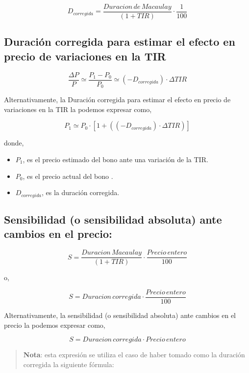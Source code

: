 \documentclass[
  letterpaper,
  DIV=11,
  numbers=noendperiod]{scrreprt}
\begin{document}
\begin{tcolorbox}
\[D_{corregida}=\frac{Duracion\,de\, Macaulay}{\left(1+TIR\right)}\cdot\frac{1}{100}\]

\subsection*{Duración corregida para estimar el efecto en precio de
variaciones en la
TIR}\label{duraciuxf3n-corregida-para-estimar-el-efecto-en-precio-de-variaciones-en-la-tir}

\[\frac{\Delta P}{P}\simeq  \frac{P_1-P_0}{P_0}\simeq \left(-D_{corregida}\right)\cdot\Delta TIR\]

Alternativamente, la Duración corregida para estimar el efecto en precio
de variaciones en la TIR la podemos expresar como,

\[P_1\simeq P_0\cdot\left[1+((-D_{corregida})\cdot\Delta TIR)\right]\]

donde,

\begin{itemize}
\item
  \(P_1\), es el precio estimado del bono ante una variación de la TIR.
\item
  \(P_0\), es el precio actual del bono .
\item
  \(D_{corregida}\), es la duración corregida.
\end{itemize}

\subsection*{Sensibilidad (o sensibilidad absoluta) ante cambios en el
precio:}\label{sensibilidad-o-sensibilidad-absoluta-ante-cambios-en-el-precio}

\[S=\frac{Duracion\,Macaulay}{\left(1+TIR\right)}\cdot\frac{Precio\,entero}{100}\]

o,

\[S= Duracion\,corregida \cdot \frac{Precio\,entero}{100}\]

Alternativamente, la sensibilidad (o sensibilidad absoluta) ante cambios
en el precio la podemos expresar como,

\[S={Duracion\,corregida }\cdot{Precio\,entero}\]

\begin{quote}
\textbf{Nota}: esta expresión se utiliza el caso de haber tomado como la
duración corregida la siguiente fórmula:
\end{quote}


\end{tcolorbox}
\end{document}
